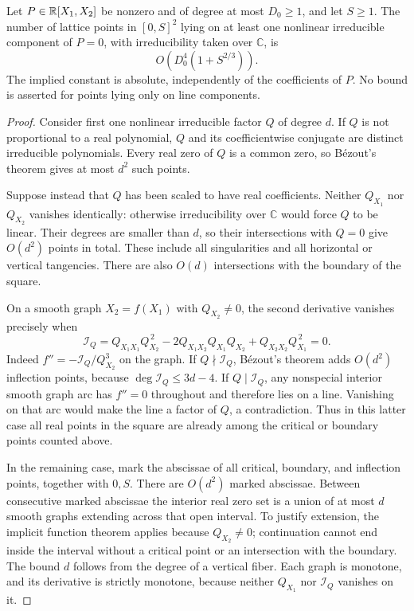 \begin{lemma}
\label{lem:nonlinear-points}
Let \(P\in\mathbb R[X_1,X_2]\) be nonzero and of degree at most \(D_0\ge1\),
and let \(S\ge1\).
The number of lattice points in \([0,S]^2\) lying on at least one
nonlinear irreducible component of \(P=0\), with irreducibility taken
over \(\mathbb C\), is
\[
 O\!\left(D_0^4(1+S^{2/3})\right).
\]
The implied constant is absolute, independently of the coefficients
of \(P\).  No bound is asserted for points lying only on line
components.
\end{lemma}

\begin{proof}
Consider first one nonlinear irreducible factor \(Q\) of degree \(d\).
If \(Q\) is not proportional to a real polynomial, \(Q\) and its
coefficientwise conjugate are distinct irreducible polynomials.  Every
real zero of \(Q\) is a common zero, so B\'ezout's theorem gives at most
\(d^2\) such points.

Suppose instead that \(Q\) has been scaled to have real coefficients.
Neither \(Q_{X_1}\) nor \(Q_{X_2}\) vanishes identically: otherwise
irreducibility over \(\mathbb C\) would force \(Q\) to be linear.
Their degrees are smaller than \(d\), so their intersections with
\(Q=0\) give \(O(d^2)\) points in total.  These include all singularities
and all horizontal or vertical tangencies.
There are also \(O(d)\) intersections with the boundary of the square.

On a smooth graph \(X_2=f(X_1)\) with \(Q_{X_2}\ne0\), the second
derivative vanishes precisely when
\begin{equation}
 \mathcal I_Q
 =Q_{X_1X_1}Q_{X_2}^{\,2}
  -2Q_{X_1X_2}Q_{X_1}Q_{X_2}
  +Q_{X_2X_2}Q_{X_1}^{\,2}
 =0.
 \label{eq:inverse-inflection}
\end{equation}
Indeed \(f''=-\mathcal I_Q/Q_{X_2}^3\) on the graph.
If \(Q\nmid\mathcal I_Q\), B\'ezout's theorem adds \(O(d^2)\)
inflection points, because \(\deg\mathcal I_Q\le3d-4\).
If \(Q\mid\mathcal I_Q\), any nonspecial interior smooth graph arc has
\(f''=0\) throughout and therefore lies on a line.  Vanishing on that
arc would make the line a factor of \(Q\), a contradiction.
Thus in this latter case all real points in the square are already
among the critical or boundary points counted above.

In the remaining case, mark the abscissae of all critical, boundary,
and inflection points, together with \(0,S\).
There are \(O(d^2)\) marked abscissae.
Between consecutive marked abscissae the interior real zero set is a
union of at most \(d\) smooth graphs extending across that open
interval.  To justify extension, the implicit function theorem applies
because \(Q_{X_2}\ne0\); continuation cannot end inside the interval
without a critical point or an intersection with the boundary.
The bound \(d\) follows from the degree of a vertical fiber.
Each graph is monotone, and its derivative is strictly monotone,
because neither \(Q_{X_1}\) nor \(\mathcal I_Q\) vanishes on it.


\end{proof}
